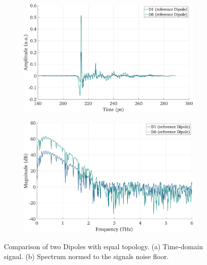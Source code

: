 \begin{figure}[h]
    \centering
    \begin{subfigure}[b]{0.485\textwidth}
        \centering
        \includegraphics[width=\textwidth]{figures/Results/D1_D6/D1_D6_time.pdf}
        \caption{}
    \end{subfigure}
    \hfill
    \begin{subfigure}[b]{0.485\textwidth}
        \centering
        \includegraphics[width=\textwidth]{figures/Results/D1_D6/D1_D6_spectrum_nn.pdf}
        \caption{}
    \end{subfigure}
    \caption{Comparison of two Dipoles with equal topology. (a) Time-domain signal. (b) Spectrum normed to the signals noise floor.}
\end{figure}

